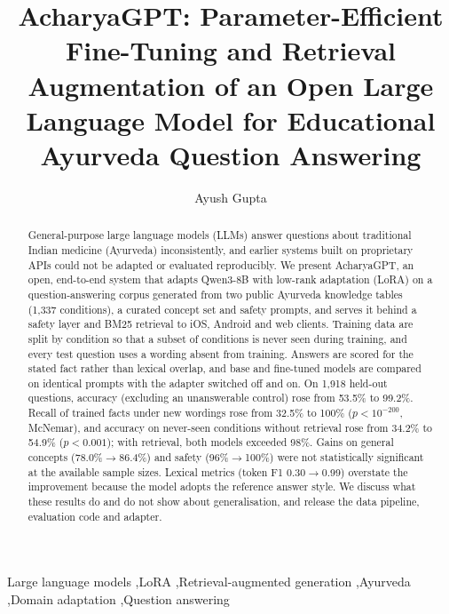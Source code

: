 \documentclass[5p,times,authoryear]{elsarticle}
\newcommand{\todo}[1]{\textcolor{red}{[TODO: #1]}}
\begin{document}
\begin{frontmatter}

\title{AcharyaGPT: Parameter-Efficient Fine-Tuning and Retrieval Augmentation of an Open Large Language Model for Educational Ayurveda Question Answering}

\author[inst1]{Ayush Gupta}
\address[inst1]{\todo{Department}, \todo{University}, \todo{City}, India}

\begin{abstract}
General-purpose large language models (LLMs) answer questions about traditional Indian medicine (Ayurveda) inconsistently, and earlier systems built on proprietary APIs could not be adapted or evaluated reproducibly. We present AcharyaGPT, an open, end-to-end system that adapts Qwen3-8B with low-rank adaptation (LoRA) on a question-answering corpus generated from two public Ayurveda knowledge tables (1,337 conditions), a curated concept set and safety prompts, and serves it behind a safety layer and BM25 retrieval to iOS, Android and web clients. Training data are split by condition so that a subset of conditions is never seen during training, and every test question uses a wording absent from training. Answers are scored for the stated fact rather than lexical overlap, and base and fine-tuned models are compared on identical prompts with the adapter switched off and on. On 1,918 held-out questions, accuracy (excluding an unanswerable control) rose from 53.5\% to 99.2\%. Recall of trained facts under new wordings rose from 32.5\% to 100\% ($p<10^{-200}$, McNemar), and accuracy on never-seen conditions without retrieval rose from 34.2\% to 54.9\% ($p<0.001$); with retrieval, both models exceeded 98\%. Gains on general concepts (78.0\%$\rightarrow$86.4\%) and safety (96\%$\rightarrow$100\%) were not statistically significant at the available sample sizes. Lexical metrics (token F1 0.30$\rightarrow$0.99) overstate the improvement because the model adopts the reference answer style. We discuss what these results do and do not show about generalisation, and release the data pipeline, evaluation code and adapter.
\end{abstract}

\begin{keyword}
Large language models \sep LoRA \sep Retrieval-augmented generation \sep Ayurveda \sep Domain adaptation \sep Question answering
\end{keyword}

\end{frontmatter}
\end{document}
